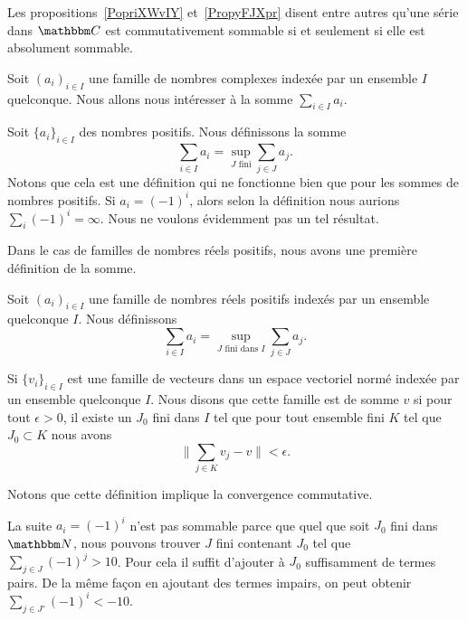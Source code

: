 Les propositions~\ref{PopriXWvIY} et~\ref{PropyFJXpr} disent entre autres qu'une série dans \( \eC\) est commutativement sommable si et seulement si elle est absolument sommable.

Soit \( (a_i)_{i\in I}\) une famille de nombres complexes indexée par un ensemble \( I\) quelconque. Nous allons nous intéresser à la somme \( \sum_{i\in I}a_i\).


Soit \( \{ a_i \}_{i\in I}\) des nombres positifs. Nous définissons la somme
\begin{equation}
    \sum_{i\in I}a_i=\sup_{ J\text{ fini}}\sum_{j\in J}a_j.
\end{equation}
Notons que cela est une définition qui ne fonctionne bien que pour les sommes de nombres positifs. Si \( a_i=(-1)^i\), alors selon la définition nous aurions \( \sum_i(-1)^i=\infty\). Nous ne voulons évidemment pas un tel résultat.

Dans le cas de familles de nombres réels positifs, nous avons une première définition de la somme.
\begin{definition}  \label{DefHYgkkA}
Soit \( (a_i)_{i\in I}\) une famille de nombres réels positifs indexés par un ensemble quelconque \( I\). Nous définissons
\begin{equation}
    \sum_{i\in I}a_i=\sup_{ J\text{ fini dans } I}\sum_{j\in J}a_j.
\end{equation}
\end{definition}

\begin{definition}  \label{DefIkoheE}
    Si \( \{ v_i \}_{i\in I}\) est une famille de vecteurs dans un espace vectoriel normé indexée par un ensemble quelconque \( I\). Nous disons que cette famille est  de somme \( v\) si pour tout \( \epsilon>0\), il existe un \( J_0\) fini dans \( I\) tel que pour tout ensemble fini \( K\) tel que \( J_0\subset K\) nous avons
    \begin{equation}
        \| \sum_{j\in K}v_j-v \|<\epsilon.
    \end{equation}
\end{definition}
Notons que cette définition implique la convergence commutative.

\begin{example}
    La suite \( a_i=(-1)^i\) n'est pas sommable parce que quel que soit \( J_0\) fini dans \( \eN\), nous pouvons trouver \( J\) fini contenant \( J_0\) tel que \( \sum_{j\in J}(-1)^j>10\). Pour cela il suffit d'ajouter à \( J_0\) suffisamment de termes pairs. De la même façon en ajoutant des termes impairs, on peut obtenir \( \sum_{j\in J'}(-1)^i<-10\).
\end{example}

